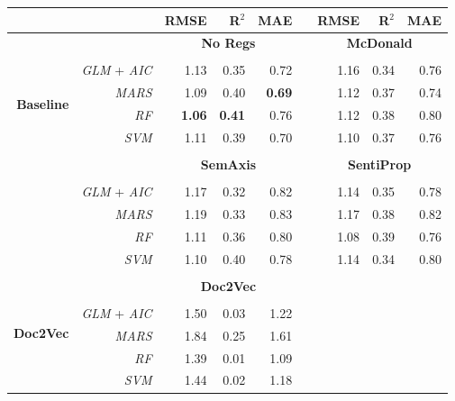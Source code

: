 \documentclass[a4paper, 12pt]{report}
\begin{document}
    \begin{table}[H]
    \centering
    \begin{threeparttable}
   \begin{tabular}{rrrrrrrrr}
      \hline
     & & \textbf{RMSE} & \textbf{R}$^2$ & \textbf{MAE} & & \textbf{RMSE} & \textbf{R}$^2$ & \textbf{MAE}\\ 
      \midrule
      \multirow{8}{*}{\textbf{Baseline}} & & \multicolumn{3}{c}{\textbf{No Regs}} & & \multicolumn{3}{c}{\textbf{McDonald}} \\
      \cmidrule{3-9}\\
      & \textit{GLM} + \textit{AIC} &  1.13 & 0.35 & 0.72 & & 1.16 & 0.34 & 0.76 \\ 
      & \textit{MARS} &  1.09 & 0.40 & \textbf{0.69} & & 1.12 & 0.37 & 0.74 \\ 
      & \textit{RF} & \textbf{1.06} & \textbf{0.41} & 0.76 & & 1.12 & 0.38 & 0.80\\ 
      & \textit{SVM} & 1.11 & 0.39 & 0.70 & & 1.10 & 0.37 & 0.76 \\ 
      \multicolumn{9}{c}{} \\
      \multirow{8}{*}{\textbf{ID}} & & \multicolumn{3}{c}{\textbf{SemAxis}} & & \multicolumn{3}{c}{\textbf{SentiProp}} \\
      \cmidrule{3-9}\\
       & \textit{GLM} + \textit{AIC} & 1.17 & 0.32 & 0.82 &  & 1.14 & 0.35 & 0.78 \\ 
      & \textit{MARS} & 1.19 & 0.33 & 0.83 &  &1.17 & 0.38 & 0.82 \\ 
      & \textit{RF} &  1.11 & 0.36 & 0.80 & & 1.08 & 0.39 & 0.76 \\ 
      & \textit{SVM} & 1.10 & 0.40 & 0.78 & & 1.14 & 0.34 & 0.80 \\
      \multicolumn{9}{c}{} \\
      \multirow{8}{*}{\textbf{Doc2Vec}} & & \multicolumn{3}{c}{\textbf{Doc2Vec}} & & \multicolumn{3}{c}{\textbf{}} \\
       \cmidrule{3-9}\\
      & \textit{GLM} + \textit{AIC} &  1.50 & 0.03 & 1.22 & \multicolumn{4}{c}{} \\ 
      & \textit{MARS} & 1.84 & 0.25 & 1.61 & \multicolumn{4}{c}{} \\
      & \textit{RF} & 1.39 & 0.01 & 1.09 &  \multicolumn{4}{c}{}\\ 
      & \textit{SVM} & 1.44 & 0.02 & 1.18 & \multicolumn{4}{c}{}\\
       \bottomrule

\end{tabular}
\end{threeparttable}
\end{table}
\end{document}
